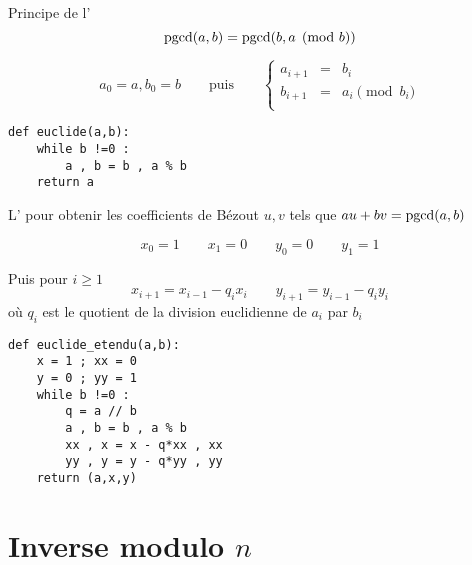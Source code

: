 \begin{frame}[fragile]
Principe de l'
$$\mathop{\text{pgcd}}\nolimits(a,b)= \mathop{\text{pgcd}}\nolimits(b, a \pmod{b})$$

\pause
\bigskip

$$a_0=a, b_0=b \qquad \text{puis} \qquad \left\{\begin{array}{rcl}
           a_{i+1} & = & b_i \\
           b_{i+1} & = & a_i \pmod {b_i} \\
         \end{array}
 \right.$$

\pause
\bigskip

\begin{algo}[euclide.py (1)]
\begin{lstlisting}
def euclide(a,b):
    while b !=0 :
        a , b = b , a % b
    return a
\end{lstlisting}  
\end{algo}    
   
\end{frame}


\begin{frame}[fragile]

L' pour obtenir les coefficients de Bézout $u,v$ tels que $au+bv=\mathop{\text{pgcd}}\nolimits(a,b)$

\pause
\medskip

$$x_0=1 \qquad  x_1=0 \qquad y_0=0 \qquad y_1 = 1$$

Puis pour $i\geq 1$
$$x_{i+1} = x_{i-1} - q_i x_i \qquad y_{i+1} = y_{i-1} - q_i y_i$$
 où $q_i$ est le quotient de la division euclidienne de $a_i$ par $b_i$

 
\pause

{\small
\begin{algo}[euclide.py (2)]
\vspace*{-1ex}
\begin{lstlisting}
def euclide_etendu(a,b):
    x = 1 ; xx = 0
    y = 0 ; yy = 1 
    while b !=0 :
        q = a // b
        a , b = b , a % b
        xx , x = x - q*xx , xx
        yy , y = y - q*yy , yy
    return (a,x,y)
\end{lstlisting}
\vspace*{-1ex}
\end{algo}
}


\end{frame}


\section{Inverse modulo $n$}

